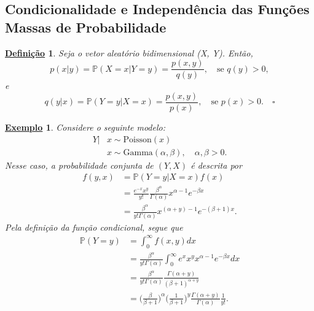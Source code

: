 \documentclass{article}
\newtheorem*{def*}{\underline{Defini\c c\~ao}}
\newtheorem{example}{\underline{Exemplo}}
\begin{document}
\subsection{Condicionalidade e Independência das Funções Massas de Probabilidade}
\begin{def*}
  Seja o vetor aleatório bidimensional (X, Y). Então, 
  \[
    p(x|y) = \mathbb{P}(X=x|Y = y) = \frac{p(x, y)}{q(y)},\quad \text{se }q(y) > 0,
  \]
  e 
  \[
    q(y| x) = \mathbb{P}(Y=y| X=x) = \frac{p(x, y)}{p(x)},\quad \text{se }p(x) > 0.\quad \square
  \]
\end{def*}
\begin{example}
  Considere o seguinte modelo:
  \begin{align*}
    Y|&x\sim \mathrm{Poisson}(x)\\
      &x\sim \mathrm{Gamma}(\alpha , \beta ),\quad \alpha , \beta >0.
  \end{align*}
  Nesse caso, a probabilidade conjunta de \((Y, X)\) é descrita por 
  \begin{align*}
    f(y, x)&= \mathbb{P}(Y=y| X=x)f(x)\\
           &= \frac{e^{-x}x^{y}}{y!}\frac{\beta ^{\alpha }}{\Gamma (\alpha )}x^{\alpha -1}e^{-\beta x}\\
           &= \frac{\beta ^{\alpha }}{y!\Gamma (\alpha )}x^{(\alpha +y)-1}e^{-(\beta +1)x}.
  \end{align*}
  Pela definição da função condicional, segue que 
  \begin{align*}
    \mathbb{P}(Y=y) &= \int_{0}^{\infty}f(x, y)dx \\
                    &= \frac{\beta ^{\alpha }}{y!\Gamma (\alpha )}\int_{0}^{\infty}e^{x}x^{y}x^{\alpha -1}e^{-\beta x}dx\\
                    &= \frac{\beta ^{\alpha }}{y!\Gamma (\alpha )}\frac{\Gamma (\alpha +y)}{(\beta +1)^{\alpha +y}}\\
                    &= \biggl(\frac{\beta }{\beta +1}\biggr)^{\alpha }\biggl(\frac{1}{\beta +1}\biggr)^{y} \frac{\Gamma (\alpha +y)}{\Gamma (\alpha )}\frac{1}{y!}.
  \end{align*}
\end{example}
\end{document}
